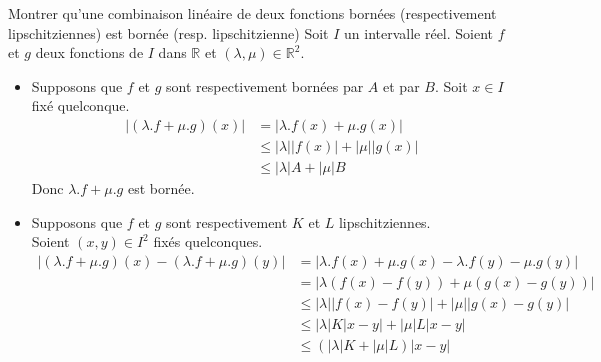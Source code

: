 \documentclass{article}
\date{12 Octobre 2024}
\begin{document}
\maketitle

\begin{question_kholle}{Montrer qu'une combinaison linéaire de deux fonctions bornées (respectivement lipschitziennes) est bornée (resp. lipschitzienne)}
	Soit $I$ un intervalle réel.
	Soient $f$ et $g$ deux fonctions de $I$ dans $\mathbb{R}$ et $(\lambda, \mu) \in \mathbb{R}^2$.
	\begin{itemize}[label=$\lozenge$]
		\item Supposons que $f$ et $g$ sont respectivement bornées par $A$ et par $B$.
		      Soit $x \in I$ fixé quelconque.
		      \begin{align*}
			      \Big| (\lambda.f + \mu.g)(x) \Big| & = \Big| \lambda.f(x) + \mu.g(x) \Big|                                             \\
			                                         & \leqslant \big| \lambda \big|  \big|f(x)\big| + \big| \mu \big|  \big| g(x) \big| \\
			                                         & \leqslant \big| \lambda \big| A + \big| \mu \big| B
		      \end{align*}
		      Donc $\lambda.f + \mu.g$ est bornée.
		\item Supposons que $f$ et $g$ sont respectivement $K$ et $L$ lipschitziennes.\\
		      Soient $(x, y) \in I^2$ fixés quelconques.
		      \begin{align*}
			      \Big| (\lambda.f + \mu.g)(x) - (\lambda.f + \mu.g)(y)\Big| & = \Big| \lambda.f(x) + \mu.g(x) - \lambda.f(y) - \mu.g(y) \Big|                                   \\
			                                                                 & = \Big| \lambda(f(x) - f(y)) + \mu(g(x) - g(y)) \Big|                                             \\
			                                                                 & \leqslant \Big| \lambda  \Big|  \Big| f(x) - f(y) \Big| + \Big| \mu \Big|  \Big|g(x) - g(y) \Big| \\
			                                                                 & \leqslant \Big| \lambda  \Big|  K \Big| x-y \Big| + \Big| \mu  \Big| L  \Big| x - y \Big|         \\
			                                                                 & \leqslant (|\lambda| K + |\mu|L ) |x - y|
		      \end{align*}
	\end{itemize}
\end{question_kholle}
\end{document}
